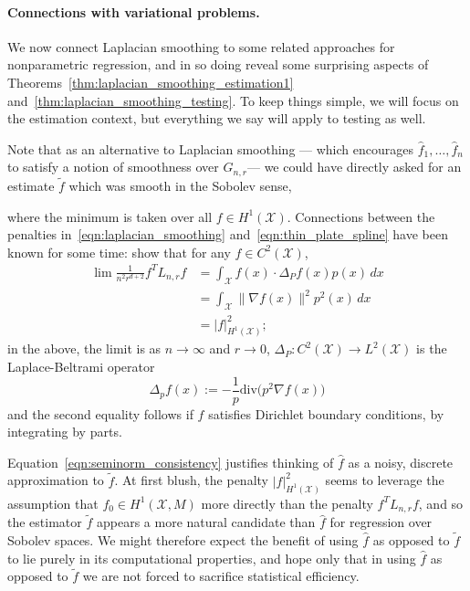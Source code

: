 \documentclass[twoside]{article}
\newcommand{\1}{\mathbf{1}}
\newcommand{\Lap}{L}
\newcommand{\Xset}{\mathcal{X}}
\newcommand{\Leb}{L}
\newcommand{\dive}{\mathrm{div}}
\newcommand{\wt}[1]{\widetilde{#1}}
\newcommand{\wh}[1]{\widehat{#1}}
\theoremstyle{definition}
\theoremstyle{remark}
\begin{document}
\paragraph{Connections with variational problems.}
We now connect Laplacian smoothing to some related approaches for nonparametric regression, and in so doing reveal some surprising aspects of Theorems~\ref{thm:laplacian_smoothing_estimation1} and~\ref{thm:laplacian_smoothing_testing}. To keep things simple, we will focus on the estimation context, but everything we say will apply to testing as well. 

Note that as an alternative to Laplacian smoothing --- which encourages $\wh{f}_1,\ldots,\wh{f}_n$ to satisfy a notion of smoothness over $G_{n,r}$--- we could have directly asked for an estimate $\wt{f}$ which was smooth in the Sobolev sense,

where the minimum is taken over all $f \in H^1(\Xset)$. Connections between the penalties in~\eqref{eqn:laplacian_smoothing} and~\eqref{eqn:thin_plate_spline} have been known for some time: \cite{bousquet03} show that for any $f \in C^2(\Xset)$, 
\begin{equation}
\label{eqn:seminorm_consistency}
\begin{aligned}
\lim \frac{1}{n^2 r^{d + 2}} f^T \Lap_{n,r} f & = \int_{\Xset} f(x) \cdot \Delta_Pf(x) p(x) \,dx \\
& = \int_{\Xset} \|\nabla f(x)\|^2 p^2(x) \,dx \\
& = |f|_{H^1(\Xset)}^2;
\end{aligned}
\end{equation}
in the above, the limit is as $n \to \infty$ and $r \to 0$, $\Delta_P: C^2(\Xset) \to \Leb^2(\Xset)$ is the Laplace-Beltrami operator
\begin{equation*}
\Delta_pf(x) := -\frac{1}{p} \dive\bigl(p^2\nabla f(x))
\end{equation*}
and the second equality follows if $f$ satisfies Dirichlet boundary conditions, by integrating by parts.

Equation~\eqref{eqn:seminorm_consistency} justifies thinking of $\wh{f}$ as a noisy, discrete approximation to $\wt{f}$. At first blush, the penalty $|f|_{H^1(\Xset)}^2$ seems to leverage the assumption that $f_0 \in H^1(\Xset,M)$ more directly than the penalty $f^T \Lap_{n,r} f$, and so the estimator $\wt{f}$ appears a more natural candidate than $\wh{f}$ for regression over Sobolev spaces. We might therefore expect the benefit of using $\wh{f}$ as opposed to $\wt{f}$ to lie purely in its computational properties, and hope only that in using $\wh{f}$ as opposed to $\wt{f}$ we are not forced to sacrifice statistical efficiency.
\end{document}

